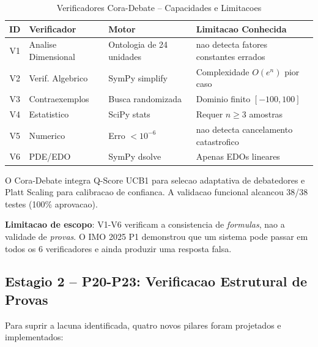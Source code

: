\documentclass[5p]{elsarticle}
\begin{document}
\begin{table}[H]
 \centering
 \caption{Verificadores Cora-Debate -- Capacidades e Limitacoes}
 \label{tab:cora}
 \footnotesize
 \begin{tabular}{clp{3cm}p{4cm}}
 \toprule
 \textbf{ID} & \textbf{Verificador} & \textbf{Motor} & \textbf{Limitacao Conhecida}\\
 \midrule
 V1 & Analise Dimensional & Ontologia de 24 unidades & nao detecta fatores constantes errados\\
 V2 & Verif. Algebrico & SymPy simplify & Complexidade $O(e^n)$ pior caso\\
 V3 & Contraexemplos & Busca randomizada & Dominio finito $[-100,100]$\\
 V4 & Estatistico & SciPy stats & Requer $n\geq 3$ amostras\\
 V5 & Numerico & Erro $<10^{-6}$ & nao detecta cancelamento catastrofico\\
 V6 & PDE/EDO & SymPy dsolve & Apenas EDOs lineares\\
 \bottomrule
 \end{tabular}
\end{table}

O Cora-Debate integra Q-Score UCB1 \cite{auer2002} para selecao adaptativa de
debatedores e Platt Scaling \cite{platt1999,guo2017} para calibracao de
confianca. A validacao funcional alcancou 38/38 testes (100\% aprovacao).

\textbf{Limitacao de escopo}: V1-V6 verificam a consistencia de \textit{formulas},
nao a validade de \textit{provas}. O IMO 2025 P1 demonstrou que um sistema pode
passar em todos os 6 verificadores e ainda produzir uma resposta falsa.

\subsection{Estagio 2 -- P20-P23: Verificacao Estrutural de Provas}

Para suprir a lacuna identificada, quatro novos pilares foram projetados e
implementados:
\end{document}
